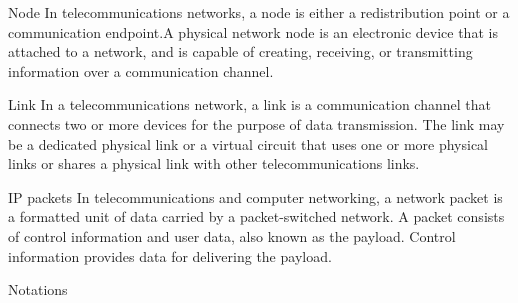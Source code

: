 \documentclass{beamer}
\begin{document}
\begin{frame}{}
\begin{block}{Node}
In telecommunications networks, a node is either a redistribution point or a communication endpoint.A physical network node is an electronic device that is attached to a network, and is capable of creating, receiving, or transmitting information over a communication channel.
\end{block}
\begin{block}{Link}
In a telecommunications network, a link is a communication channel that connects two or more devices for the purpose of data transmission. The link may be a dedicated physical link or a virtual circuit that uses one or more physical links or shares a physical link with other telecommunications links.
\end{block}
\begin{block}{IP packets}
In telecommunications and computer networking, a network packet is a formatted unit of data carried by a packet-switched network. A packet consists of control information and user data, also known as the payload. Control information provides data for delivering the payload.
\end{block}
\end{frame}
\begin{frame}[fragile]{Notations}
     \begin{figure}
    \label{Notations}
\end{figure}  
\end{frame}
\end{document}
